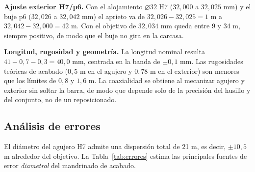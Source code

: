 \documentclass[12pt,a4paper]{article}
\begin{document}
\textbf{Ajuste exterior H7/p6.} Con el alojamiento $\varnothing32$ H7
($32{,}000$ a $32{,}025$ mm) y el buje p6 ($32{,}026$ a $32{,}042$ mm) el
aprieto
va de $32{,}026-32{,}025=1$ \textmu m a $32{,}042-32{,}000=42$ \textmu m. Con el
objetivo de $32{,}034$ mm queda entre 9 y 34 \textmu m, siempre positivo, de
modo
que el buje no gira en la carcasa.

\textbf{Longitud, rugosidad y geometría.} La longitud nominal resulta
$41-0{,}7-0{,}3=40{,}0$ mm, centrada en la banda de $\pm0{,}1$ mm. Las
rugosidades teóricas de acabado ($0{,}5$ \textmu m en el agujero y $0{,}78$ \textmu m
en el exterior) son menores que los límites de $0{,}8$ y $1{,}6$ \textmu m. La
coaxialidad se obtiene al mecanizar agujero y exterior sin soltar la barra, de
modo que depende solo de la precisión del husillo y del conjunto, no de un
reposicionado.

\subsection{Análisis de errores}

El diámetro del agujero H7 admite una dispersión total de 21 \textmu m, es decir,
$\pm10{,}5$ \textmu m alrededor del objetivo. La Tabla~\ref{tab:errores} estima las
principales fuentes de error \emph{diametral} del mandrinado de acabado.
\end{document}
